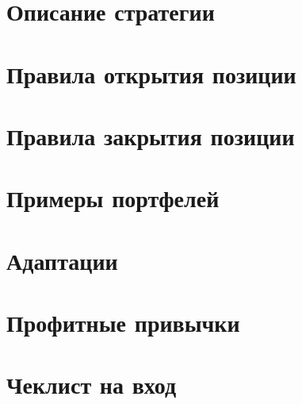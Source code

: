 \documentclass[12pt,DIV=18]{scrartcl}
\begin{document}
\section{Описание стратегии}
\label{chapter4}
\section{Правила открытия позиции}
\label{chapter5}
\section{Правила закрытия позиции}
\label{chapter6}
\section{Примеры портфелей}
\label{chapter7}
\section{Адаптации}
\label{chapter8}
\section{Профитные привычки}
\label{chapter9}


\appendix
\section{Чеклист на вход}
\label{appendix}
\end{document}
